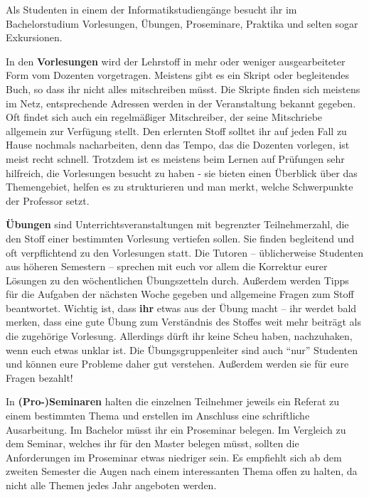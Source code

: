 
Als Studenten in einem der Informatikstudiengänge besucht ihr im
  Bachelorstudium Vorlesungen, Übungen, Proseminare, Praktika
  und selten sogar Exkursionen.

In den \textbf{Vorlesungen} wird der Lehrstoff in mehr oder weniger
  ausgearbeiteter Form vom Dozenten vorgetragen.  Meistens gibt
  es ein Skript oder begleitendes Buch, so dass ihr nicht alles mitschreiben 
  müsst.  Die Skripte finden sich meistens im Netz, entsprechende Adressen 
  werden in der Veranstaltung bekannt gegeben. Oft findet sich auch ein 
  regelmäßiger Mitschreiber, der seine Mitschriebe allgemein zur Verfügung 
  stellt. Den erlernten Stoff solltet ihr auf jeden Fall zu Hause nochmals 
  nacharbeiten, denn das Tempo, das die Dozenten vorlegen, ist meist recht 
  schnell. Trotzdem ist es meistens beim Lernen auf Prüfungen sehr hilfreich, 
  die Vorlesungen besucht zu haben - sie bieten einen Überblick über das 
  Themengebiet, helfen es zu strukturieren und man merkt, welche Schwerpunkte 
  der Professor setzt.

\textbf{Übungen} sind Unterrichtsveranstaltungen mit begrenzter
  Teilnehmerzahl, die den Stoff einer bestimmten Vorlesung vertiefen
  sollen. Sie finden begleitend und oft verpflichtend zu den
  Vorlesungen statt. Die Tutoren -- üblicherweise Studenten aus höheren
  Semestern -- sprechen mit euch vor allem die Korrektur eurer
  Lösungen zu den wöchentlichen Übungszetteln durch.  Außerdem
  werden Tipps für die Aufgaben der nächsten Woche gegeben und
  allgemeine Fragen zum Stoff beantwortet.  Wichtig ist, dass \textbf{ihr}
  etwas aus der Übung macht -- ihr werdet bald merken, dass eine gute
  Übung zum Verständnis des Stoffes weit mehr beiträgt als die
  zugehörige Vorlesung.  Allerdings dürft ihr keine Scheu haben,
  nachzuhaken, wenn euch etwas unklar ist.  Die Übungsgruppenleiter
  sind auch "`nur"' Studenten und können eure Probleme daher gut
  verstehen.  Außerdem werden sie für eure Fragen bezahlt!

In \textbf{(Pro-)Seminaren} halten die einzelnen Teilnehmer jeweils ein
  Referat zu einem bestimmten Thema und erstellen im Anschluss eine schriftliche
  Ausarbeitung.  Im Bachelor müsst ihr ein Proseminar belegen.  Im
  Vergleich zu dem Seminar, welches ihr für den Master belegen müsst, sollten 
  die Anforderungen im Proseminar etwas niedriger sein. Es empfiehlt sich ab
  dem zweiten Semester die Augen nach einem interessanten Thema offen zu
  halten, da nicht alle Themen jedes Jahr angeboten werden.

